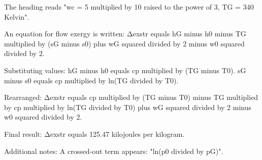 The heading reads "wc = 5 multiplied by 10 raised to the power of 3, TG = 340 Kelvin".  

An equation for flow exergy is written:  
Δexstr equals hG minus h0 minus TG multiplied by (sG minus s0) plus wG squared divided by 2 minus w0 squared divided by 2.  

Substituting values:  
hG minus h0 equals cp multiplied by (TG minus T0).  
sG minus s0 equals cp multiplied by ln(TG divided by T0).  

Rearranged:  
Δexstr equals cp multiplied by (TG minus T0) minus TG multiplied by cp multiplied by ln(TG divided by T0) plus wG squared divided by 2 minus w0 squared divided by 2.  

Final result:  
Δexstr equals 125.47 kilojoules per kilogram.  

Additional notes:  
A crossed-out term appears: "ln(p0 divided by pG)".